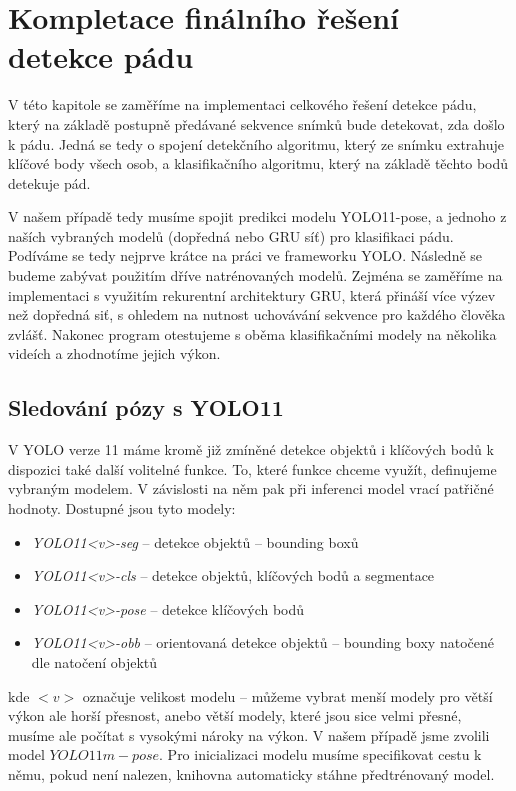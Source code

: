 \chapter{Kompletace finálního řešení detekce pádu}
\label{chap:detectionProgram}

V této kapitole se zaměříme na implementaci celkového řešení detekce pádu,
který na základě postupně předávané sekvence snímků bude detekovat, zda došlo k
pádu. Jedná se tedy o spojení detekčního algoritmu, který ze snímku extrahuje
klíčové body všech osob, a klasifikačního algoritmu, který na základě těchto
bodů detekuje pád.

V našem případě tedy musíme spojit predikci modelu YOLO11-pose, a jednoho z
naších vybraných modelů (dopředná nebo GRU síť) pro klasifikaci pádu. Podíváme
se tedy nejprve krátce na práci ve frameworku YOLO. Následně se budeme zabývat
použitím dříve natrénovaných modelů. Zejména se zaměříme na implementaci s
využitím rekurentní architektury GRU, která přináší více výzev než dopředná
siť, s ohledem na nutnost uchovávání sekvence pro každého člověka zvlášť.
Nakonec program otestujeme s oběma klasifikačními modely na několika videích a
zhodnotíme jejich výkon.

\section{Sledování pózy s YOLO11}

V YOLO verze 11 máme kromě již zmíněné detekce objektů i klíčových bodů k
dispozici také další volitelné funkce. To, které funkce chceme využít,
definujeme vybraným modelem. V závislosti na něm pak při inferenci model vrací
patřičné hodnoty. Dostupné jsou tyto modely:
\begin{itemize}
    \item \textit{YOLO11<v>-seg } – detekce objektů – bounding boxů
    \item \textit{YOLO11<v>-cls } – detekce objektů, klíčových bodů a segmentace
    \item \textit{YOLO11<v>-pose} – detekce klíčových bodů
    \item \textit{YOLO11<v>-obb } – orientovaná detekce objektů – bounding boxy natočené dle natočení objektů
\end{itemize}

kde $<v>$ označuje velikost modelu – můžeme vybrat menší modely pro větší výkon
ale horší přesnost, anebo větší modely, které jsou sice velmi přesné, musíme
ale počítat s vysokými nároky na výkon. V našem případě jsme zvolili model
$YOLO11m-pose$. Pro inicializaci modelu musíme specifikovat cestu k němu, pokud
není nalezen, knihovna automaticky stáhne předtrénovaný model.

